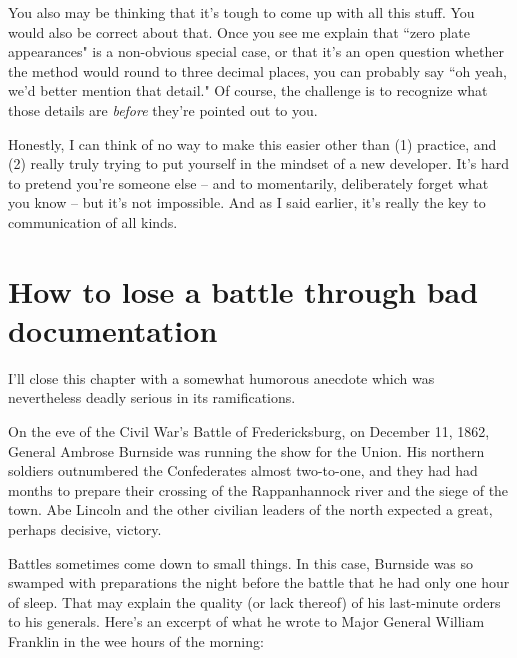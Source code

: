 You also may be thinking that it's tough to come up with all this stuff. You
would also be correct about that. Once you see me explain that ``zero plate
appearances" is a non-obvious special case, or that it's an open question
whether the method would round to three decimal places, you can probably say
``oh yeah, we'd better mention that detail." Of course, the challenge is to
recognize what those details are \textit{before} they're pointed out to you.

Honestly, I can think of no way to make this easier other than (1) practice,
and (2) really truly trying to put yourself in the mindset of a new developer.
It's hard to pretend you're someone else -- and to momentarily, deliberately
forget what you know -- but it's not impossible. And as I said earlier, it's
really the key to communication of all kinds.

\section{How to lose a battle through bad documentation}

I'll close this chapter with a somewhat humorous anecdote which was
nevertheless deadly serious in its ramifications.

On the eve of the Civil War's Battle of Fredericksburg, on December 11, 1862,
General Ambrose Burnside was running the show for the Union. His northern
soldiers outnumbered the Confederates almost two-to-one, and they had had
months to prepare their crossing of the Rappanhannock river and the siege of
the town. Abe Lincoln and the other civilian leaders of the north expected a
great, perhaps decisive, victory.

Battles sometimes come down to small things. In this case, Burnside was so
swamped with preparations the night before the battle that he had only one
hour of sleep. That may explain the quality (or lack thereof) of his
last-minute orders to his generals. Here's an excerpt of what he wrote to
Major General William Franklin in the wee hours of the morning:


\begin{center}
\large
{}
\end{center}

